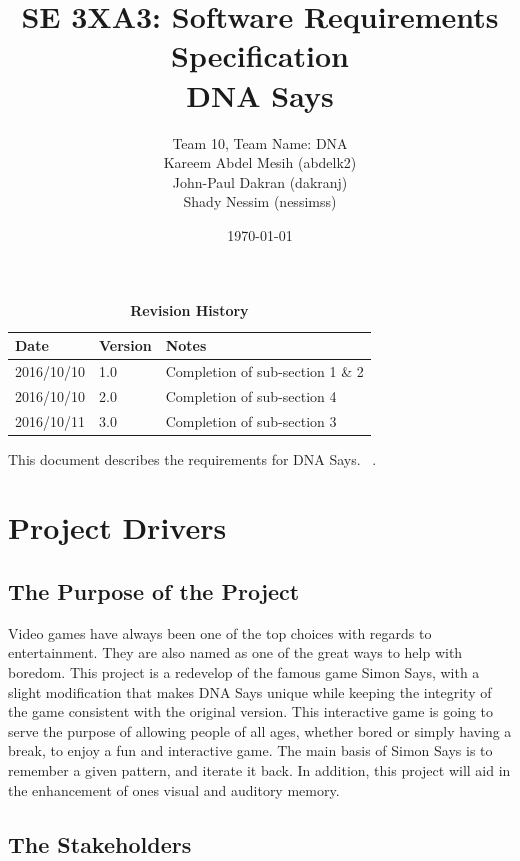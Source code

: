 \documentclass[12pt, titlepage]{article}
\title{SE 3XA3: Software Requirements Specification\\DNA Says}
\author{Team 10, Team Name: DNA
		\\ Kareem Abdel Mesih (abdelk2)
		\\ John-Paul Dakran (dakranj)
		\\ Shady Nessim (nessimss)
}
\date{\today}
\begin{document}
\maketitle

\tableofcontents
\listoftables
\listoffigures

\begin{table}[bp]
\caption{\bf Revision History}
\begin{tabularx}{\textwidth}{p{3cm}p{2cm}X}
\toprule {\bf Date} & {\bf Version} & {\bf Notes}\\
\midrule
2016/10/10 & 1.0 & Completion of sub-section 1 \& 2\\
2016/10/10 & 2.0 & Completion of sub-section 4 \\
2016/10/11 & 3.0 & Completion of sub-section 3 \\
\bottomrule
\end{tabularx}
\end{table}

\newpage


This document describes the requirements for DNA Says. ~\citep{RobertsonAndRobertson2012}.

\section{Project Drivers}

\subsection{The Purpose of the Project}
Video games have always been one of the top choices with regards to entertainment. They are also named as one of the great ways to help with boredom. This project is a redevelop of the famous game Simon Says, with a slight modification that makes DNA Says unique while keeping the integrity of the game consistent with the original version. This interactive game is going to serve the purpose of allowing people of all ages, whether bored or simply having a break, to enjoy a fun and interactive game. The main basis of Simon Says is to remember a given pattern, and iterate it back. In addition, this project will aid in the enhancement of ones visual and auditory memory.
\subsection{The Stakeholders}
\end{document}
